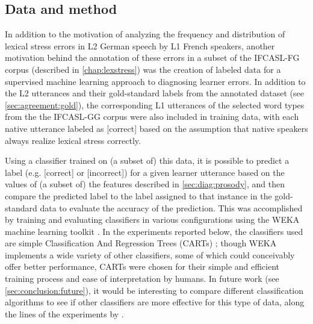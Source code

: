 	\subsection{Data and method}
	\label{sec:classification:datamethod}
	
		
		In addition to the motivation of analyzing the frequency and distribution of lexical stress errors in L2 German speech by L1 French speakers, another motivation behind the annotation of these errors in a subset of the IFCASL-FG corpus (described in \cref{chap:lexstress}) was the creation of labeled data for a supervised machine learning approach to diagnosing learner errors. In addition to the L2 utterances and their gold-standard labels from the annotated dataset (see \cref{sec:agreement:gold}), the corresponding L1 utterances of the selected word types from the the IFCASL-GG corpus were also included in training data, with each native utterance labeled as [correct] based on the assumption that native speakers always realize lexical stress correctly.
		
		Using a classifier trained on (a subset of) this data, it is possible to predict a label (e.g. [correct] or [incorrect]) for a given learner utterance based on the values of (a subset of) the features described in \cref{sec:diag:prosody}, and then compare the predicted label to the label assigned to that instance in the gold-standard data to evaluate the accuracy of the prediction. 
		This was accomplished by training and evaluating classifiers in various configurations using the WEKA machine learning toolkit \citep{Hall2009}. 	
		In the experiments reported below, 
		the classifiers used are
		simple Classification And Regression Trees (CARTs) \citep{Breiman1984}; 
		though WEKA implements a wide variety of other classifiers, some of which 
		could conceivably offer better performance,
		CARTs were chosen for their simple and efficient training process and ease of interpretation by humans.
		In future work (see \cref{sec:conclusion:future}), it would be interesting to compare different classification algorithms to see if other classifiers are more effective for this type of data, along the lines of the experiments by \textcite{Kim2011}.
		
